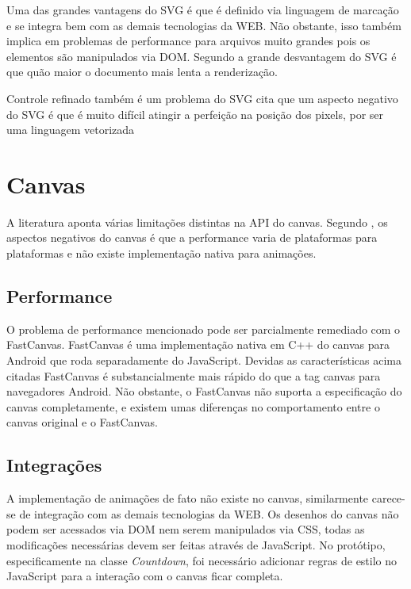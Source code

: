 Uma das grandes vantagens do SVG é que é definido via linguagem de
marcação e se integra bem com as demais tecnologias da WEB. Não
obstante, isso também implica em problemas de performance para arquivos
muito grandes pois os elementos são manipulados via DOM. Segundo
\cite{html5mostwanted} a grande desvantagem do SVG é que quão maior o
documento mais lenta a renderização.

Controle refinado também é um problema do SVG \cite{html5mostwanted}
cita que um aspecto negativo do SVG é que é muito difícil atingir a
perfeição na posição dos pixels, por ser uma linguagem vetorizada

\section{Canvas}

A literatura aponta várias limitações distintas na API do canvas.
Segundo \autocite{html5mostwanted}, os aspectos negativos do canvas é
que a performance varia de plataformas para plataformas e não existe
implementação nativa para animações.

\subsection{Performance}

O problema de performance mencionado pode ser parcialmente remediado
com o FastCanvas. FastCanvas é uma implementação nativa em C++ do
canvas para Android que roda separadamente do JavaScript. Devidas as
características acima citadas FastCanvas é substancialmente mais
rápido do que a tag canvas para navegadores Android. Não obstante, o
FastCanvas não suporta a especificação do canvas completamente, e
existem umas diferenças no comportamento entre o canvas original e o
FastCanvas.

\subsection{Integrações}

A implementação de animações de fato não existe no canvas,
similarmente carece-se de integração com as demais tecnologias
da WEB. Os desenhos do canvas não podem ser acessados via DOM nem
serem manipulados via CSS, todas as modificações necessárias devem
ser feitas através de JavaScript.
No protótipo, especificamente na classe \textit{Countdown}, foi necessário
adicionar regras de estilo no JavaScript para a interação com o canvas
ficar completa.

